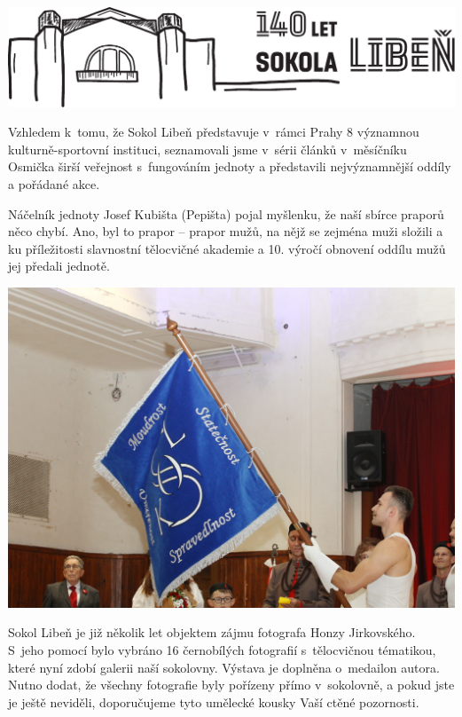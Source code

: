 \documentclass[11pt]{article}
\begin{document}
\begin{center}
  \includegraphics[width=0.7\linewidth]{./logo-140-horiz.pdf}
\end{center}

Vzhledem k~tomu, že Sokol Libeň představuje v~rámci Prahy 8 významnou
kulturně-sportovní instituci, seznamovali jsme v~sérii článků
v~měsíčníku Osmička širší veřejnost s~fungováním jednoty a představili
nejvýznamnější oddíly a pořádané akce.

Náčelník jednoty Josef Kubišta (Pepišta) pojal myšlenku, že naší sbírce
praporů něco chybí. Ano, byl to prapor -- prapor mužů, na nějž se
zejména muži složili a ku příležitosti slavnostní tělocvičné akademie a
10. výročí obnovení oddílu mužů jej předali jednotě.

\begin{center}
  \includegraphics[width=0.8\linewidth]{./FOTKY ZPRAVY/PRAPOR 2.JPG}
\end{center}

\clearpage

Sokol Libeň je již několik let objektem zájmu fotografa Honzy
Jirkovského. S~jeho pomocí bylo vybráno 16 černobílých fotografií
s~tělocvičnou tématikou, které nyní zdobí galerii naší sokolovny.
Výstava je doplněna o~medailon autora. Nutno dodat, že všechny
fotografie byly pořízeny přímo v~sokolovně, a pokud jste je ještě
neviděli, doporučujeme tyto umělecké kousky Vaší ctěné pozornosti.
\end{document}
